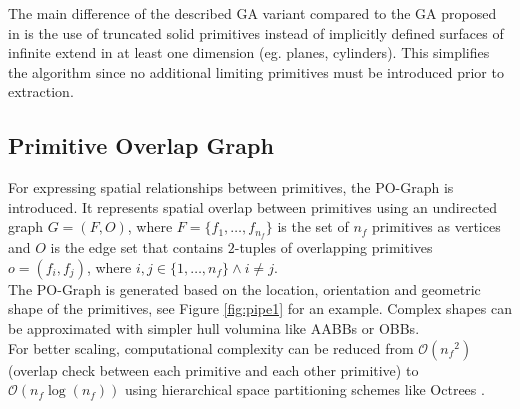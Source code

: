 The main difference of the described \ac{GA} variant compared to the \ac{GA} proposed in \cite{fayolle2016evolutionary} is the use of truncated solid primitives instead of implicitly defined surfaces of infinite extend in at least one dimension (eg. planes, cylinders). 
This simplifies the algorithm since no additional limiting primitives must be introduced prior to extraction.
\subsection{Primitive Overlap Graph}
\label{ch:pog}
For expressing spatial relationships between primitives, the \ac{PO}-Graph is introduced.
It represents spatial overlap between primitives using an undirected graph $G=(F,O)$, where $F = \{f_1,\dots,f_{n_f}\}$ is the set of $n_f$ primitives as vertices and $O$ is the edge set that contains $2$-tuples of overlapping primitives $o=(f_i,f_j)$, where $i,j \in \{1,\dots,n_f\} \land i \ne j$. 
\\
The \ac{PO}-Graph is generated based on the location, orientation and geometric shape of the primitives, see Figure \ref{fig:pipe1} for an example.
Complex shapes can be approximated with simpler hull volumina like \acp{AABB} or \acp{OBB}.
\\
For better scaling, computational complexity can be reduced from $\mathcal{O}({n_f}^2)$ (overlap check between each primitive and each other primitive) to $\mathcal{O}(n_f\log(n_f))$ using hierarchical space partitioning schemes like Octrees \cite{meagher1982Octree}.

